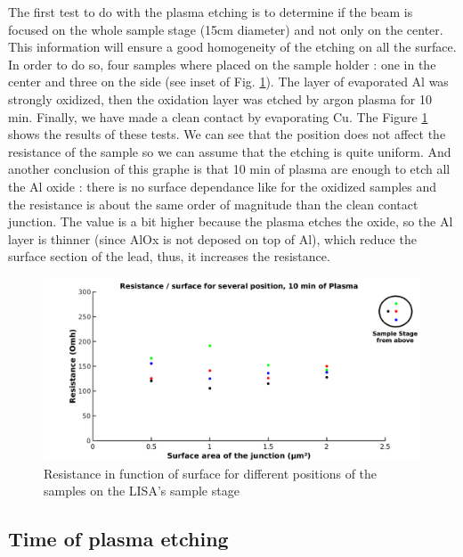                 The first test to do with the plasma etching is to determine if the beam is focused on the whole sample stage (15cm diameter) and not only on the center. This information will ensure a good homogeneity of the etching on all the surface. In order to do so, four samples where placed on the sample holder : one in the center and three on the side (see inset of Fig. \ref{PlasmaPosition}). The layer of evaporated Al was strongly oxidized, then the oxidation layer was etched by argon plasma for 10 min. Finally, we have made a clean contact by evaporating Cu. The Figure \ref{PlasmaPosition} shows the results of these tests. We can see that the position does not affect the resistance of the sample so we can assume that the etching is quite uniform. And another conclusion of this graphe is that 10 min of plasma are enough to etch all the Al oxide : there is no surface dependance like for the oxidized samples and the resistance is about the same order of magnitude than the clean contact junction. The value is a bit higher because the plasma etches the oxide, so the Al layer is thinner (since AlOx is not deposed on top of Al), which reduce the surface section of the lead, thus, it increases the resistance.
              
                \begin{figure}
                    \centering
                    \includegraphics[width=15cm]{R_Position.png}
                    \caption{Resistance in function of surface for different positions of the samples on the LISA's sample stage}
                    \label{PlasmaPosition}
                \end{figure}               
                
                
                \subsection{Time of plasma etching}
                
